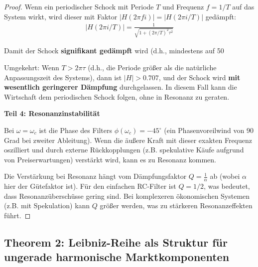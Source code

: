 \documentclass[a4paper, 12pt, twoside, openright]{report}
\theoremstyle{definition}
\theoremstyle{definition}
\begin{document}
\begin{proof}
Wenn ein periodischer Schock mit Periode $T$ und Frequenz $f = 1/T$ auf das System wirkt, wird dieser mit Faktor $|H(2\pi f i)| = |H(2\pi i / T)|$ gedämpft:
\begin{align}
|H(2\pi i/T)| = \frac{1}{\sqrt{1 + (2\pi/T)^2\tau^2}}
\end{align}

Damit der Schock \textbf{signifikant gedämpft} wird (d.h., mindestens auf 50%

Umgekehrt: Wenn $T > 2\pi\tau$ (d.h., die Periode größer als die natürliche Anpassungszeit des Systems), dann ist $|H| > 0.707$, und der Schock wird \textbf{mit wesentlich geringerer Dämpfung} durchgelassen. In diesem Fall kann die Wirtschaft dem periodischen Schock folgen, ohne in Resonanz zu geraten.

\textbf{Teil 4: Resonanzinstabilität}

Bei $\omega = \omega_c$ ist die Phase des Filters $\phi(\omega_c) = -45^\circ$ (ein Phasenvoreilwind von 90 Grad bei zweiter Ableitung). Wenn die äußere Kraft mit dieser exakten Frequenz oszilliert und durch externe Rückkopplungen (z.B. spekulative Käufe aufgrund von Preiserwartungen) verstärkt wird, kann es zu Resonanz kommen.

Die Verstärkung bei Resonanz hängt vom Dämpfungsfaktor $Q = \frac{1}{\alpha}$ ab (wobei $\alpha$ hier der Gütefaktor ist). Für den einfachen RC-Filter ist $Q = 1/2$, was bedeutet, dass Resonanzüberschüsse gering sind. Bei komplexeren ökonomischen Systemen (z.B. mit Spekulation) kann $Q$ größer werden, was zu stärkeren Resonanzeffekten führt.

\end{proof}

\subsection*{Theorem 2: Leibniz-Reihe als Struktur für ungerade harmonische Marktkomponenten}
\end{document}
